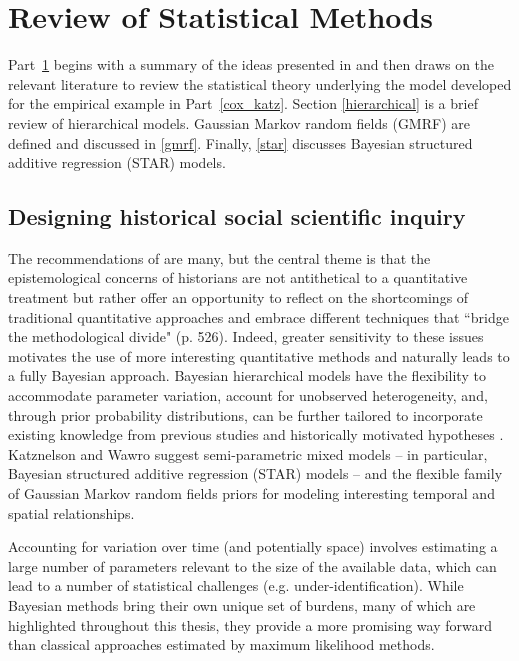 
\chapter{Review of Statistical Methods}
\label{lit_review}

Part~\ref{lit_review} begins with a summary of the ideas presented in 
 and then draws on the relevant literature 
to review the statistical theory underlying the model developed for the empirical 
example in Part~\ref{cox_katz}. Section \ref{hierarchical} is a brief review of 
hierarchical models. Gaussian Markov random fields (GMRF) are defined and 
discussed in \ref{gmrf}. Finally, \ref{star} discusses Bayesian structured additive 
regression (STAR) models. 

\section{Designing historical social scientific inquiry}
\label{wawro}

The recommendations of  are many, but the central 
theme is that the epistemological concerns of historians are not antithetical to a 
quantitative treatment but rather offer an opportunity to reflect on the shortcomings 
of traditional quantitative approaches and embrace different techniques that ``bridge 
the methodological divide" (p. 526). Indeed, greater sensitivity to these issues motivates 
the use of more interesting quantitative methods and naturally leads to a fully Bayesian 
approach.  Bayesian hierarchical models have the flexibility to accommodate parameter 
variation, account for unobserved heterogeneity, and, through prior probability distributions, 
can be further tailored to incorporate existing knowledge from previous studies and 
historically motivated hypotheses  \cite{wawro_designing_2014, goodrich_designing_2012}. 
Katznelson and Wawro suggest  semi-parametric mixed models -- in particular,  Bayesian 
structured additive regression (STAR) models -- and the flexible family of Gaussian Markov 
random fields priors for modeling interesting temporal and spatial relationships.

Accounting for variation over time (and potentially space) involves estimating 
a large number of parameters relevant to the size of the available data, which can lead 
to a number of statistical challenges (e.g. under-identification). While Bayesian methods 
bring their own unique set of burdens, many of which are highlighted throughout this 
thesis, they provide a more promising way forward than classical approaches estimated 
by maximum likelihood methods. 


